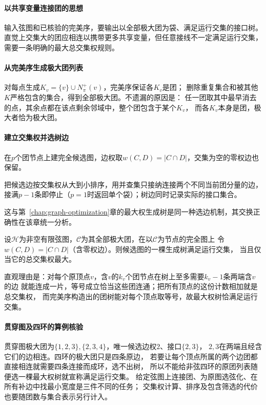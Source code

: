 \paragraph{以共享变量连接团的思想}
输入弦图和已核验的完美序，要输出以全部极大团为袋、满足运行交集的接口树。
直觉上交集大的团应相连以携带更多共享变量，但任意接线不一定满足运行交集，
需要一条明确的最大总交集权规则。

\paragraph{从完美序生成极大团列表}
对每点生成$K_v=\{v\}\cup N^+_\pi(v)$，完美序保证各$K_v$是团；
删除重复集合和被其他$K$严格包含的集合，得到全部极大团。不遗漏的原因是：
任一团取其中最早消去的点，其余点都在该点剩余邻域中，整个团包含于某个$K_v$，
而各$K_v$本身是团，极大者恰为极大团。

\paragraph{建立交集权并选树边}
在$p$个团节点上建完全候选图，边权取$w(C,D)=|C\cap D|$，交集为空的零权边也保留。
\begin{algorithm}[最大交集权团树]
  把候选边按交集权从大到小排序，用并查集只接纳连接两个不同当前团分量的边，
  接满$p-1$条即停止（$p=1$时返回单个袋）；树边同时记录实际的接口集合。
\end{algorithm}
这与第~\ref{chap:graph-optimization}章的最大权生成树是同一种选边机制，其交换正确性在该章统一分析。

\begin{theorem}[最大权生成树与团树]
  \label{thm:graph-theory-clique-tree-maximum-weight}
  设$\mathcal H$为非空有限弦图，$\mathcal C$为其全部极大团，在以$\mathcal C$为节点的完全图上
  令$w(C,D)=|C\cap D|$（含零权边）。则候选图的一棵生成树满足运行交集，
  当且仅当它的总交集权最大。
\end{theorem}
直观理由是：对每个原顶点$v$，含$v$的$k_v$个团节点在树上至多需要$k_v-1$条两端含$v$的边
就能连成一片，等号成立恰当这些团连通；把所有顶点的这份计数相加就是总交集权，
而完美序构造出的团树能对每个顶点取等号，故最大权树恰满足运行交集。

\paragraph{贯穿图及四环的算例核验}
贯穿图极大团为$\{1,2,3\},\{2,3,4\}$，唯一候选边权$2$、接口$\{2,3\}$，
$2,3$在两端且经含它们的边相连。四环的极大团只是四条原边，
若要让每个顶点所属的两个边团都直接相连就需要四条连接而成环，选不出树，
所以不能给非弦四环的原团列表随便选一棵最大权树就宣称满足运行交集。
给定弦图上连接团、为原图选弦化、在所有补边中找最小宽度是三件不同的任务；
交集权计算、排序及包含筛选的代价也要随团数与集合表示另行计入。

